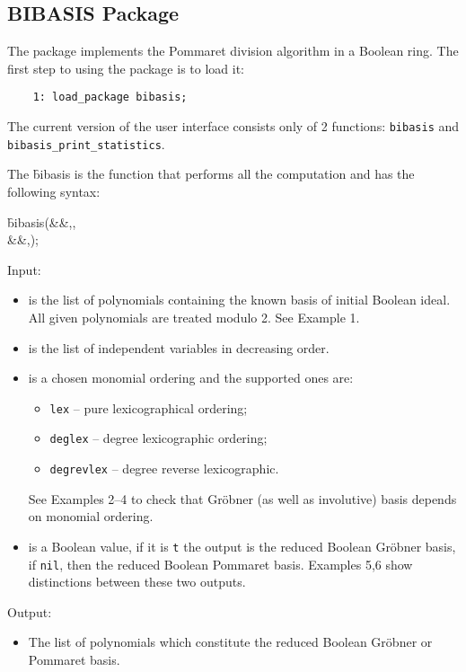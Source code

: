 \subsection{\textsc{BIBASIS} Package}

The package  implements the Pommaret division algorithm in a Boolean ring. The first step to using the package
is to load it:
\begin{verbatim}
    1: load_package bibasis;
\end{verbatim}
The current version of the  user interface consists only of 2 functions:
\texttt{bibasis} and
\texttt{bibasis\_print\_statistics}.

\hypertarget{operator:BIBASIS}{}
\noindent The \f{bibasis} is the function that performs all the computation and has the following syntax:
\begin{syntaxtable}
  \f{bibasis}(&&,,\\
              &&,);
\end{syntaxtable}
Input:
\begin{itemize}
    \item {} is the list of polynomials containing the known basis of initial
Boolean ideal. All given polynomials are treated modulo 2. See Example 1.

    \item {} is the list of independent variables in decreasing order.

    \item {} is a chosen monomial ordering and the supported ones are:
        \begin{itemize}
            \item[] \texttt{lex} -- pure lexicographical ordering;
            \item[] \texttt{deglex} -- degree lexicographic ordering;
            \item[] \texttt{degrevlex} -- degree reverse lexicographic.
        \end{itemize}
        See Examples 2--4 to check that Gr\"obner (as well as involutive) basis depends on monomial ordering.

    \item {} is a Boolean value, if it is \texttt{t} the output is the reduced
        Boolean Gr\"obner basis, if \texttt{nil}, then the reduced Boolean Pommaret basis. Examples 5,6 show distinctions between these two outputs.
\end{itemize}
Output:
\begin{itemize}
 \item The list of polynomials which constitute the reduced Boolean Gr\"obner or Pommaret basis.
\end{itemize}

